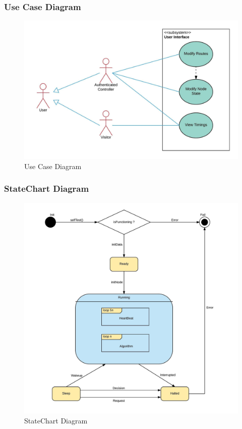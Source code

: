 \documentclass[12pt,a4paper,final]{report}
\begin{document}
\subsubsection{Use Case Diagram}
	\begin{figure}[!h]
		\begin{center}
			\includegraphics[scale=0.2]{Diagrams/Use_Case_Diagram.jpeg}
		\end{center}
		\caption{Use Case Diagram}
	\end{figure}
	
\subsubsection{StateChart Diagram}
	\begin{figure}[!h]
		\begin{center}
			\includegraphics[scale=0.12]{Diagrams/StateChart_Diagram.jpeg}
		\end{center}
		\caption{StateChart Diagram}
	\end{figure}
\end{document}

